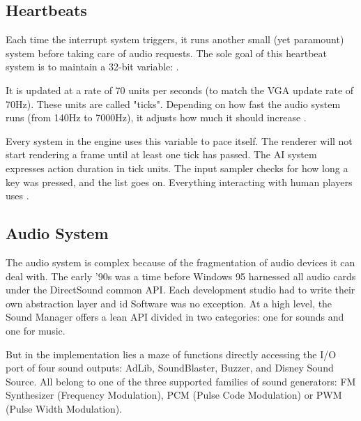 \subsection{Heartbeats}
Each time the interrupt system triggers, it runs another small (yet paramount) system before taking care of audio requests. The sole goal of this heartbeat system is to maintain a 32-bit variable: .\\
\par
\begin{minipage}{\textwidth}

\end{minipage}
\par
It is updated at a rate of 70 units per seconds (to match the VGA update rate of 70Hz). These units are called "ticks". Depending on how fast the audio system runs (from 140Hz to 7000Hz), it adjusts how much it should increase .\\
\par
Every system in the engine uses this variable to pace itself. The renderer will not start rendering a frame until at least one tick has passed. The AI system expresses action duration in tick units. The input sampler checks for how long a key was pressed, and the list goes on. Everything interacting with human players uses .\\













\subsection{Audio System}
The audio system is complex because of the fragmentation of audio devices it can deal with. The early '90s was a time before Windows 95 harnessed all audio cards under the DirectSound common API. Each development studio had to write their own abstraction layer and id Software was no exception. At a high level, the Sound Manager offers a lean API divided in two categories: one for sounds and one for music.\\
\par
\begin{minipage}{\textwidth}

\end{minipage}
\par
\begin{minipage}{\textwidth}

\end{minipage}
\par
\vspace{10pt}
But in the implementation lies a maze of functions directly accessing the I/O port of four sound outputs: AdLib, SoundBlaster, Buzzer, and Disney Sound Source. All belong to one of the three supported families of sound generators: FM Synthesizer (Frequency Modulation), PCM (Pulse Code Modulation) or PWM (Pulse Width Modulation).\\


